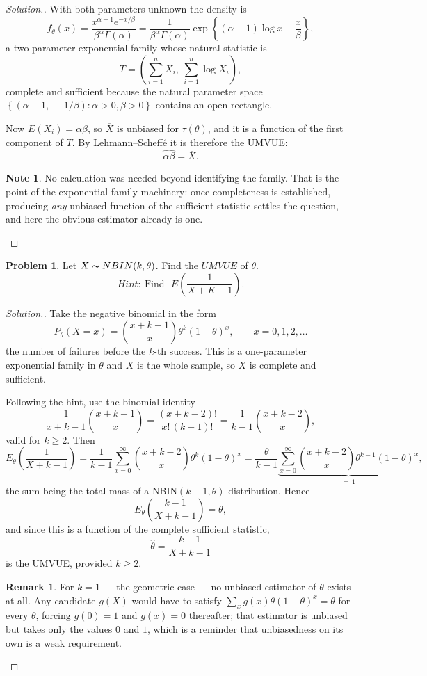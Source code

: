 \documentclass[12pt,a4paper]{report}
\theoremstyle{definition}
\newtheorem*{note}{Note}
\newtheorem*{remark}{Remark}
\newtheorem{problemx}{Problem}[section]
\newenvironment{problem}{\begin{problemx}}{\end{problemx}}
\newenvironment{solution}
  {\renewcommand{\qedsymbol}{}\begin{proof}[\textit{Solution}.]}
  {\end{proof}}
\begin{document}
\begin{solution}
With both parameters unknown the density is
\[f_{\theta}(x) = \frac{x^{\alpha-1}e^{-x/\beta}}{\beta^{\alpha}\Gamma(\alpha)}
= \frac{1}{\beta^{\alpha}\Gamma(\alpha)}
\exp\left\{(\alpha-1)\log x - \frac{x}{\beta}\right\},\]
a two-parameter exponential family whose natural statistic is
\[T = \left(\sum_{i=1}^{n}X_i,\ \sum_{i=1}^{n}\log X_i\right),\]
complete and sufficient because the natural parameter space
$\left\{(\alpha-1,\,-1/\beta):\alpha>0,\beta>0\right\}$ contains an open
rectangle.

Now $E(X_i)=\alpha\beta$, so $\overline{X}$ is unbiased for $\tau(\theta)$, and
it is a function of the first component of $T$. By Lehmann--Scheff\'e it is
therefore the UMVUE:
\[\widehat{\alpha\beta} = \overline{X}.\]

\begin{note}
No calculation was needed beyond identifying the family. That is the point of
the exponential-family machinery: once completeness is established, producing
\emph{any} unbiased function of the sufficient statistic settles the question,
and here the obvious estimator already is one.
\end{note}
\end{solution}

\begin{problem}
Let $X\thicksim NBIN(k, \theta)$. Find the $UMVUE$ of $\theta$. \[\textit{Hint:}\ \, \text{Find}\,\,\, \, E\left(\frac{1}{X + K - 1}\right).\]
\end{problem}

\begin{solution}
Take the negative binomial in the form
\[P_{\theta}(X=x) = \binom{x+k-1}{x}\theta^{k}(1-\theta)^{x},
\qquad x = 0,1,2,\dots\]
the number of failures before the $k$-th success. This is a one-parameter
exponential family in $\theta$ and $X$ is the whole sample, so $X$ is complete
and sufficient.

Following the hint, use the binomial identity
\[\frac{1}{x+k-1}\binom{x+k-1}{x}
= \frac{(x+k-2)!}{x!\,(k-1)!}
= \frac{1}{k-1}\binom{x+k-2}{x},\]
valid for $k\geq 2$. Then
\[E_{\theta}\left(\frac{1}{X+k-1}\right)
= \frac{1}{k-1}\sum_{x=0}^{\infty}\binom{x+k-2}{x}\theta^{k}(1-\theta)^{x}
= \frac{\theta}{k-1}\underbrace{\sum_{x=0}^{\infty}\binom{x+k-2}{x}\theta^{k-1}(1-\theta)^{x}}_{\textstyle =\,1},\]
the sum being the total mass of a NBIN$(k-1,\theta)$ distribution. Hence
\[E_{\theta}\left(\frac{k-1}{X+k-1}\right) = \theta ,\]
and since this is a function of the complete sufficient statistic,
\[\widehat{\theta} = \frac{k-1}{X+k-1}\]
is the UMVUE, provided $k\geq2$.

\begin{remark}
For $k=1$ --- the geometric case --- no unbiased estimator of $\theta$ exists at
all. Any candidate $g(X)$ would have to satisfy
$\sum_x g(x)\theta(1-\theta)^{x} = \theta$ for every $\theta$, forcing
$g(0)=1$ and $g(x)=0$ thereafter; that estimator is unbiased but takes only the
values $0$ and $1$, which is a reminder that unbiasedness on its own is a weak
requirement.
\end{remark}
\end{solution}
\end{document}
